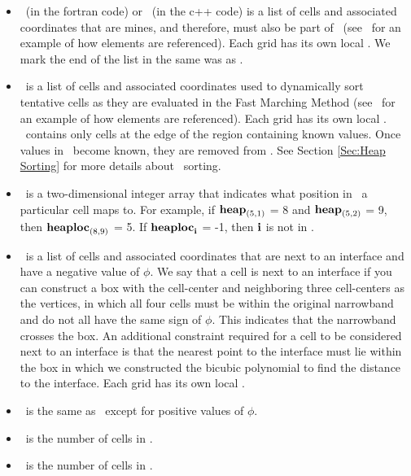 \begin{itemize}
\item \mine~(in the fortran code) or \LSmine~(in the c++ code) is a list of cells and associated coordinates that are mines, and therefore, must also be part of \nband~(see \nband~for an example of how elements are referenced).  Each grid has its own local \mine.  We mark the end of the list in the same was as \nband.

\item \heap~is a list of cells and associated coordinates used to dynamically sort tentative cells as they are evaluated in the Fast Marching Method (see \nband~for an example of how elements are referenced).  Each grid has its own local \heap.  \heap~contains only cells at the edge of the region containing known values.  Once values in \heap~become known, they are removed from \heap.  See Section \ref{Sec:Heap Sorting} for more details about \heap~sorting.

\item \heaploc~is a two-dimensional integer array that indicates what position in \heap~a particular cell maps to.  For example, if ${\tt{\bf heap}}_{(5,1)}$ = 8 and ${\tt{\bf heap}}_{(5,2)}$ = 9, then ${\tt{\bf heaploc}}_{(8,9)}$ = 5.  If ${\tt{\bf heaploc}}_{\bf i}$ = -1, then ${\bf i}$ is not in \heap.

\item \intfacen~is a list of cells and associated coordinates that are next to an interface and have a negative value of $\phi$.  We say that a cell is next to an interface if you can construct a box with the cell-center and neighboring three cell-centers as the vertices, in which all four cells must be within the original narrowband and do not all have the same sign of $\phi$.  This indicates that the narrowband crosses the box.  An additional constraint required for a cell to be considered next to an interface is that the nearest point to the interface must lie within the box in which we constructed the bicubic polynomial to find the distance to the interface.  Each grid has its own local \intfacen.

\item \intfacep~is the same as \intfacen~except for positive values of $\phi$.

\item \intfacenumn~is the number of cells in \intfacen.

\item \intfacenump~is the number of cells in \intfacep.

\end{itemize}

